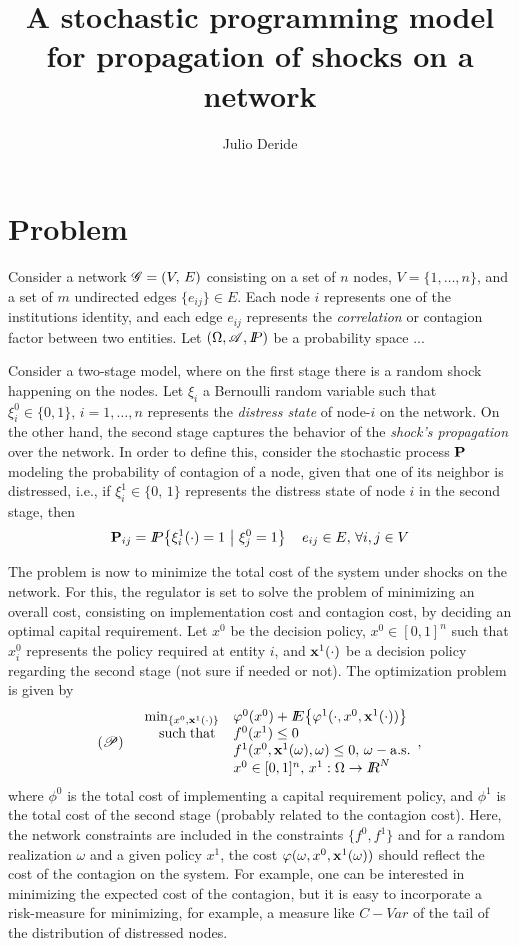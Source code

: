 \documentclass[12pt,letterpaper]{article}
\title{A stochastic programming model for propagation of shocks on a network}
\author{Julio Deride}
\begin{document}
\maketitle
\baselineskip=15pt

\section{Problem}
Consider a network $\rsG=(V,\,E)$ consisting on a set of $n$ nodes, $V=\{1,\ldots,n\}$, and a set of $m$ undirected edges $\{e_{ij}\}\in E$. Each node $i$ represents one of the institutions identity, and each edge $e_{ij}$ represents the \emph{correlation} or contagion factor between two entities. Let $(\Omega,\rsA,\Pro)$ be a probability space ...


Consider a two-stage model, where on the first stage there is a random shock happening on the nodes.   Let $\xi_i$ a Bernoulli random variable such that $\xi^0_i\in\{0,1\},\,i=1,\ldots,n$ represents the \emph{distress state} of node-$i$ on the network.  On the other hand, the second stage captures the behavior of the \emph{shock's propagation} over the network.  In order to define this, consider the stochastic process ${\bf P}$ modeling the probability of contagion of a node, given that one of its neighbor is distressed, i.e., if $\xi^1_i\in\{0,\,1\}$ represents the distress state of node $i$ in the second stage, then
\[{\bf P}_{ij}=\Pro\lset \xi^1_i(\cdot)=1\,\mset\,\xi^0_j=1\rset\,\quad e_{ij}\in E,\,\forall i,j\in V\]

The problem is now to minimize the total cost of the system under shocks on the network.  For this, the regulator is set to solve the problem of minimizing an overall cost, consisting on implementation cost and contagion cost, by deciding an optimal capital requirement.  Let $x^0$ be the decision policy, $x^0\in[0,1]^n$ such that $x^0_i$ represents the policy required at entity $i$, and ${\bf x}^1(\cdot)$ be a decision policy regarding the second stage (not sure if needed or not).  The optimization problem is given by
\[(\rsP)\quad \begin{array}{rl}\min_{\{x^0,{\bf x}^1(\cdot)\}}&\phi^0(x^0)+\Ex\lset \phi^1(\cdot,x^0,{\bf x}^1(\cdot))\rset\\
\suchthat&f^0(x^1)\leq 0 \\
&f^1(x^0,{\bf x}^1(\omega),\omega)\leq 0,\,\omega-\as\\
&x^0\in[0,1]^n,\,x^1:\Omega\to\reals^N\end{array},\]
where $\phi^0$ is the total cost of implementing a capital requirement policy, and $\phi^1$ is the total cost of the second stage (probably related to the contagion cost). Here, the network constraints are included in the constraints $\{f^0,f^1\}$ and for a random realization $\omega$ and a given policy $x^1$, the cost $\phi(\omega,x^0,{\bf x}^1(\omega))$ should reflect the cost of the contagion on the system. For example, one can be interested in minimizing the expected cost of the contagion, but it is easy to incorporate a risk-measure for minimizing, for example, a measure like $C-Var$ of the tail of the distribution of distressed nodes.


\end{document}
